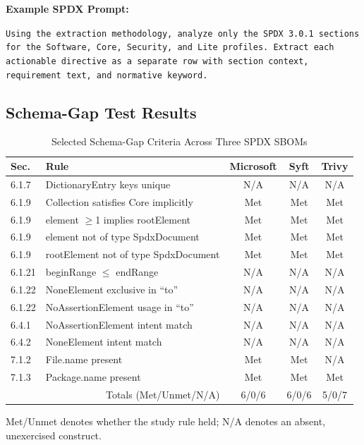 \noindent\textbf{Example SPDX Prompt:}
\vspace{-0.4em}
\begin{tcolorbox}[colback=gray!4!white, colframe=black!80, boxrule=0.5pt, left=3pt, right=3pt, top=2pt, bottom=2pt, arc=2pt]
\tiny
\vspace{-0.8em}
\texttt{Using the extraction methodology, analyze only the SPDX 3.0.1 sections for the Software, Core, Security, and Lite profiles. Extract each actionable directive as a separate row with section context, requirement text, and normative keyword.}
\vspace{-0.8em}
\end{tcolorbox}

\subsection{Schema-Gap Test Results}

\vspace{-1.4em}
\begin{table}[ht]
\centering
\tiny
\caption{Selected Schema-Gap Criteria Across Three SPDX SBOMs}
\vspace{-1.4em}
\label{tab:spdx-schema-gap}
\begin{tabular}{llccc}
\toprule
Sec. & Rule & Microsoft & Syft & Trivy \\
\midrule
6.1.7  & DictionaryEntry keys unique          & N/A  & N/A  & N/A  \\
6.1.9  & Collection satisfies Core implicitly & Met & Met & Met \\
6.1.9  & element $\geq$1 implies rootElement  & Met & Met & Met \\
6.1.9  & element not of type SpdxDocument      & Met & Met & Met \\
6.1.9  & rootElement not of type SpdxDocument  & Met & Met & Met \\
6.1.21 & beginRange $\leq$ endRange            & N/A  & N/A  & N/A  \\
6.1.22 & NoneElement exclusive in ``to''       & N/A  & N/A  & N/A  \\
6.1.22 & NoAssertionElement usage in ``to''    & N/A  & N/A  & N/A  \\
6.4.1  & NoAssertionElement intent match       & N/A  & N/A  & N/A  \\
6.4.2  & NoneElement intent match              & N/A  & N/A  & N/A  \\
7.1.2  & File.name present                     & Met & Met & N/A  \\
7.1.3  & Package.name present                  & Met & Met & Met \\
\midrule
\multicolumn{2}{r}{Totals (Met/Unmet/N/A)} & 6/0/6 & 6/0/6 & 5/0/7 \\
\bottomrule
\end{tabular}
\par\smallskip
{\scriptsize Met/Unmet denotes whether the study rule held; N/A denotes an absent, unexercised construct.}
\end{table}

